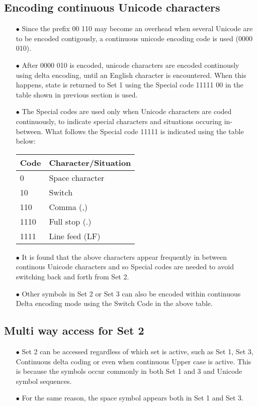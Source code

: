 \documentclass[]{article}
\begin{document}
\subsection{Encoding continuous Unicode characters}
\begin{itemize}
	\item[$\bullet$] Since the prefix 00 110 may become an overhead when several Unicode are to be encoded contigously, a continuous unicode encoding code is used (0000 010).
	\item[$\bullet$] After 0000 010 is encoded, unicode characters are encoded continously using delta encoding, until an English character is encountered. When this happens, state is returned to Set 1 using the Special code 11111 00 in the table shown in previous section is used.
	\item[$\bullet$] The Special codes are used only when Unicode characters are coded continuously, to indicate special characters and situations occuring in-between. What follows the Special code 11111 is indicated using the table below:
	\item[] \begin{tabular}{ | l | l |} \hline
	\textbf{Code} & \textbf{Character/Situation} \\ \hline
	0 & Space character \\ \hline
	10 & Switch \\ \hline
	110 & Comma (,) \\ \hline
	1110 & Full stop (.) \\ \hline
	1111 & Line feed (LF) \\ \hline
    \end{tabular}
	\item[$\bullet$] It is found that the above characters appear frequently in between continous Unicode characters and so Special codes are needed to avoid switching back and forth from Set 2.
	\item[$\bullet$] Other symbols in Set 2 or Set 3 can also be encoded within continuous Delta encoding mode using the Switch Code in the above table.
\end{itemize}

\subsection{Multi way access for Set 2}
\begin{itemize}
	\item[$\bullet$] Set 2 can be accessed regardless of which set is active, such as Set 1, Set 3, Continuous delta coding or even when continuous Upper case is active. This is because the symbols occur commonly in both Set 1 and 3 and Unicode symbol sequences.
	\item[$\bullet$] For the same reason, the space symbol appears both in Set 1 and Set 3.
\end{itemize}
\end{document}

